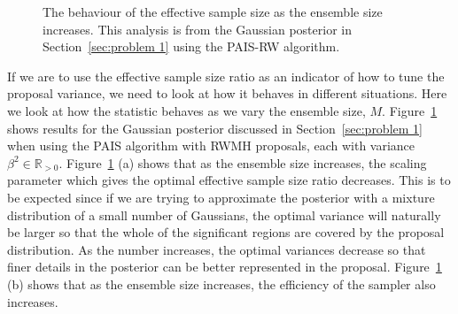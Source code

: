 \documentclass[final]{siamltex}
\begin{document}
\begin{figure}[htb]
\centering
{}
\caption{The behaviour of the effective sample size as the ensemble size increases. This analysis is from the Gaussian posterior in Section~\ref{sec:problem 1} using the PAIS-RW algorithm.}
\label{fig:neff-M}
\end{figure}

If we are to use the effective sample size ratio as an indicator of
how to tune the proposal variance, we need to look at how it behaves
in different situations. Here we look at how the statistic behaves as
we vary the ensemble size, $M$. Figure~\ref{fig:neff-M} shows results
for the Gaussian posterior discussed in Section~\ref{sec:problem 1}
when using the PAIS algorithm with RWMH proposals, each with variance
$\beta^2 \in \mathbb{R}_{>0}$. Figure~\ref{fig:neff-M} (a) shows that
as the ensemble size increases, the scaling parameter which gives the
optimal effective sample size ratio decreases. This is to be expected
since if we are trying to approximate the posterior with a mixture
distribution of a small number of Gaussians, the optimal variance will
naturally be larger so that the whole of the significant regions are
covered by the proposal distribution. As the number increases, the
optimal variances decrease so that finer details in the posterior can
be better represented in the proposal. Figure~\ref{fig:neff-M} (b) shows that as the ensemble size increases, the efficiency of the sampler also increases.
\end{document}
